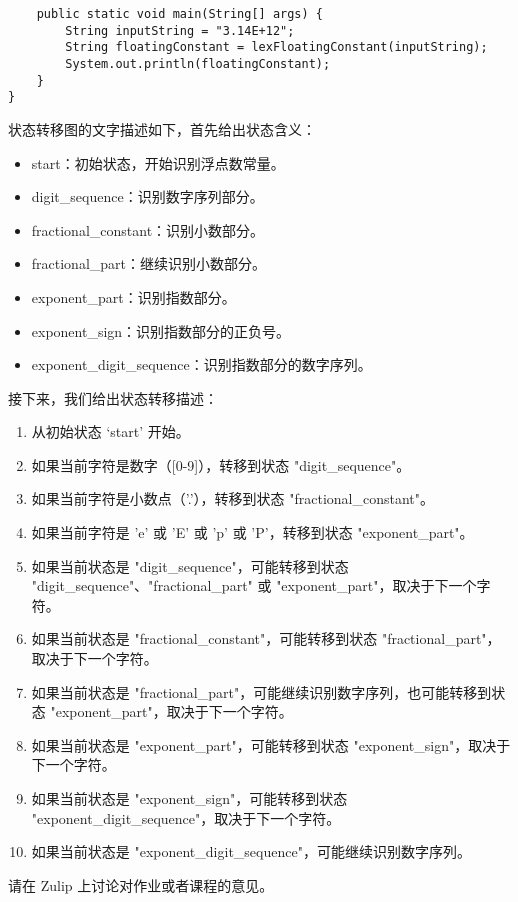 \documentclass[a4paper, justified]{tufte-handout}
\begin{document}
\begin{solution}
\begin{lstlisting}
    public static void main(String[] args) {
        String inputString = "3.14E+12";
        String floatingConstant = lexFloatingConstant(inputString);
        System.out.println(floatingConstant);
    }
}
  \end{lstlisting}
  状态转移图的文字描述如下，首先给出状态含义：
  \begin{itemize}
    \item start：初始状态，开始识别浮点数常量。
    \item digit\_sequence：识别数字序列部分。
    \item fractional\_constant：识别小数部分。
    \item fractional\_part：继续识别小数部分。
    \item exponent\_part：识别指数部分。
    \item exponent\_sign：识别指数部分的正负号。
    \item exponent\_digit\_sequence：识别指数部分的数字序列。
  \end{itemize}
  接下来，我们给出状态转移描述：
  \begin{enumerate}[(1)]
    \item 从初始状态 `start' 开始。
    \item 如果当前字符是数字（[0-9]），转移到状态 "digit\_sequence"。
    \item 如果当前字符是小数点（'.'），转移到状态 "fractional\_constant"。
    \item 如果当前字符是 'e' 或 'E' 或 'p' 或 'P'，转移到状态 "exponent\_part"。
    \item 如果当前状态是 "digit\_sequence"，可能转移到状态 "digit\_sequence"、"fractional\_part" 或 "exponent\_part"，取决于下一个字符。
    \item 如果当前状态是 "fractional\_constant"，可能转移到状态 "fractional\_part"，取决于下一个字符。
    \item 如果当前状态是 "fractional\_part"，可能继续识别数字序列，也可能转移到状态 "exponent\_part"，取决于下一个字符。
    \item 如果当前状态是 "exponent\_part"，可能转移到状态 "exponent\_sign"，取决于下一个字符。
    \item 如果当前状态是 "exponent\_sign"，可能转移到状态 "exponent\_digit\_sequence"，取决于下一个字符。
    \item 如果当前状态是 "exponent\_digit\_sequence"，可能继续识别数字序列。
  \end{enumerate}
\end{solution}



\beginfb

请在 Zulip 上讨论对作业或者课程的意见。
\end{document}
